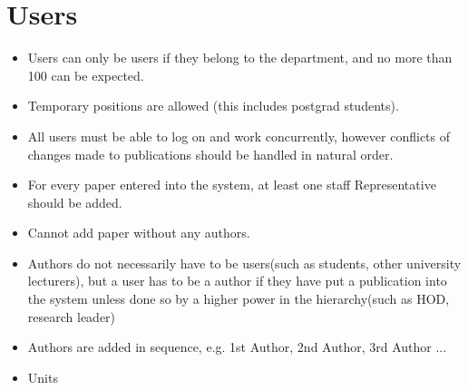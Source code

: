 \documentclass[12pt, letterpaper, twoside]{article}
\begin{document}
\section{Users}
\begin{itemize}  

    \item Users can only be users if they belong to the department, and no more than 100 can be expected.
    \item Temporary positions are allowed (this includes postgrad students).
    \item All users must be able to log on and work concurrently, however conflicts of changes made to publications should be handled in natural order.
    \item For every paper entered into the system, at least one staff Representative should be added.
    \item Cannot add paper without any authors.
    \item Authors do not necessarily have to be users(such as students, other university lecturers), but a user has to be a author if they have put a publication into the system unless done so by a higher power in the hierarchy(such as HOD, research leader)
    \item Authors are added in sequence, e.g. 1st Author, 2nd Author, 3rd Author ...
    \item Units 

\end{itemize}

 
\end{document}
